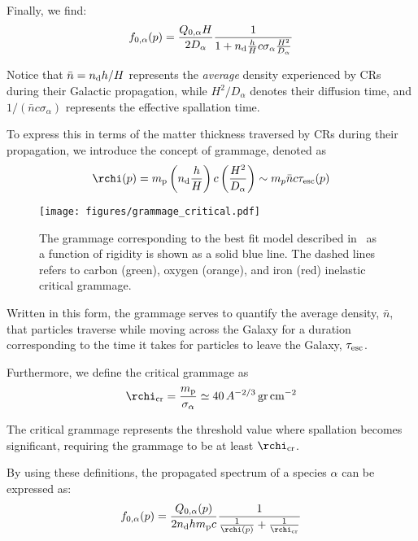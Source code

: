 Finally, we find:
%
\begin{equation}
f_{0,\alpha}(p) = \frac{Q_{0,\alpha} H}{2D_\alpha} \frac{1}{1 + n_{\rm d} \frac{h}{H} c \sigma_{\alpha} \frac{H^2}{D_\alpha}}
\end{equation}

Notice that $\bar n = n_{\rm d} h/H$ represents the \emph{average} density experienced by CRs during their Galactic propagation, while $H^2/D_\alpha$ denotes their diffusion time, and $1/(\bar n c \sigma_\alpha)$ represents the effective spallation time.

To express this in terms of the matter thickness traversed by CRs during their propagation, we introduce the concept of grammage, denoted as 
%
\begin{equation}
\rchi(p) = m_{\rm p} \left( n_{\rm d} \frac{h}{H} \right) c \left( \frac{H^2}{D_\alpha} \right) \sim m_p \bar n c \tau_{\rm esc}(p)
\label{eq:grammage}
\end{equation}

\begin{figure}[t]
\centering
\texttt{[image: figures/grammage\_critical.pdf]}
\caption{The grammage corresponding to the best fit model described in~\cite{Schroer2021prd} as a function of rigidity is shown as a solid blue line. The dashed lines refers to carbon (green), oxygen (orange), and iron (red) inelastic critical grammage.}
\label{fig:grammage}
\end{figure}

Written in this form, the grammage serves to quantify the average density, $\bar n$, that particles traverse while moving across the Galaxy for a duration corresponding to the time it takes for particles to leave the Galaxy, $\tau_{\rm esc}$.

Furthermore, we define the critical grammage as 
%
\begin{equation}
\rchi_{\rm cr} = \frac{m_{\rm p}}{\sigma_\alpha} \simeq 40 \, A^{-2/3} \, \text{gr} \, \text{cm}^{-2}
\end{equation}

The critical grammage represents the threshold value where spallation becomes significant, requiring the grammage to be at least $\rchi_{\rm cr}$.

By using these definitions, the propagated spectrum of a species $\alpha$ can be expressed as:
%
\begin{equation}
f_{0,\alpha}(p) = \frac{Q_{0,\alpha}(p)}{2n_{\rm d}hm_{\rm p}c} \frac{1}{\frac{1}{\rchi(p)} + \frac{1}{\rchi_{\rm cr}}}
\label{eq:finalprimary}
\end{equation}

